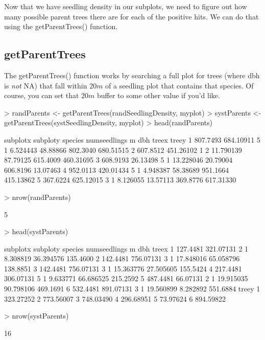 \documentclass{article}
\begin{document}
Now that we have seedling density in our subplots, we need to figure out how many possible parent trees there are for each of the positive hits. We can do that using the getParentTrees() function.

\subsection{getParentTrees}

The getParentTrees() function works by searching a full plot for trees (where dbh is \textit{not} NA) that fall within $20 m$ of a seedling plot that contains that species. Of course, you can set that $20 m$ buffer to some other value if you'd like.

\begin{Schunk}
\begin{Sinput}
> randParents <- getParentTrees(randSeedlingDensity, myplot)
> systParents <- getParentTrees(systSeedlingDensity, myplot)
> head(randParents)
\end{Sinput}
\begin{Soutput}
  subplotx  subploty species numseedlings         m      dbh    treex     treey
1 807.7493 684.10911       5            1  6.524443 48.88866 802.3040 680.51515
2 607.8512 451.26102       1            2 11.790139 87.79125 615.4009 460.31695
3 608.9193  26.13498       5            1 13.228046 20.79004 606.8196  13.07463
4 952.0113 420.01434       5            1  4.948387 58.38689 951.1664 415.13862
5 367.6224 625.12015       3            1  8.126055 13.57113 369.8776 617.31330
\end{Soutput}
\begin{Sinput}
> nrow(randParents)
\end{Sinput}
\begin{Soutput}
[1] 5
\end{Soutput}
\begin{Sinput}
> head(systParents)
\end{Sinput}
\begin{Soutput}
  subplotx  subploty species numseedlings         m       dbh    treex
1 127.4481 321.07131       2            1  8.308819 36.394576 135.4600
2 142.4481 756.07131       3            1 17.848016 65.058796 138.8851
3 142.4481 756.07131       3            1 15.363776 27.505605 155.5424
4 217.4481 306.07131       5            1  9.633771 66.686525 215.2592
5 487.4481  66.07131       2            1 19.915035 90.798106 469.1691
6 532.4481 891.07131       3            1 19.560899  8.282892 551.6884
      treey
1 323.27252
2 773.56007
3 748.03490
4 296.68951
5  73.97624
6 894.59822
\end{Soutput}
\begin{Sinput}
> nrow(systParents)
\end{Sinput}
\begin{Soutput}
[1] 16
\end{Soutput}
\end{Schunk}
\end{document}
